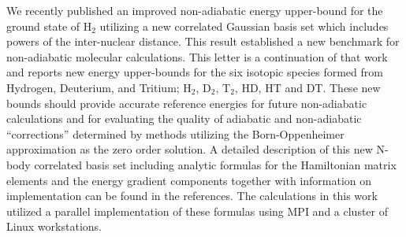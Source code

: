 We recently published an improved non-adiabatic energy upper-bound for
the ground state of H$_2$ utilizing a new correlated Gaussian basis
set which includes powers of the inter-nuclear
distance\cite{Kinghorn99b}.  This result established a new benchmark
for non-adiabatic molecular calculations. This letter is a
continuation of that work and reports new energy upper-bounds for the
six isotopic species formed from Hydrogen, Deuterium, and Tritium;
H$_2$, D$_2$, T$_2$, HD, HT and DT. These new bounds should provide
accurate reference energies for future non-adiabatic calculations and
for evaluating the quality of adiabatic and non-adiabatic
``corrections'' determined by methods utilizing the Born-Oppenheimer
approximation as the zero order solution.  A detailed description of
this new N-body correlated basis set including analytic formulas for
the Hamiltonian matrix elements and the energy gradient components
together with information on implementation can be found in the
references\cite{Kinghorn99a}.  The calculations in this work utilized
a parallel implementation of these formulas using MPI and a cluster of
Linux workstations.

